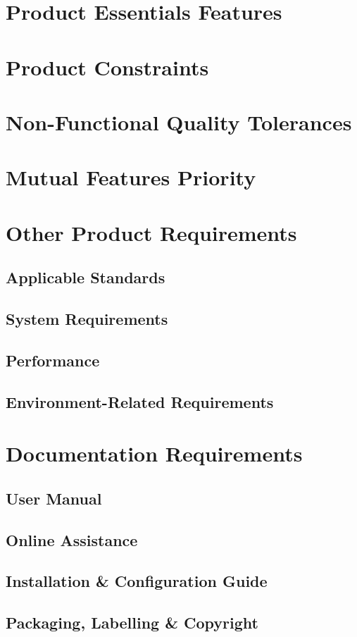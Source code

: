 \documentclass[12pt,a4paper,oneside, titlepage]{article}
\begin{document}
	\section{Product Essentials Features}

    \newpage
	\section{Product Constraints}
	
    \newpage
	\section{Non-Functional Quality Tolerances}
	
	\newpage
	\section{Mutual Features Priority}
	
    \newpage
	\section{Other Product Requirements}
	\subsection{Applicable Standards}
	\subsection{System Requirements}
	\subsection{Performance}
	\subsection{Environment-Related Requirements}

    \newpage
	\section{Documentation Requirements}
	\subsection{User Manual}
	\subsection{Online Assistance}
	\subsection{Installation \& Configuration Guide}
	\subsection{Packaging, Labelling \& Copyright}
    \newpage
    {}
    
\end{document}
